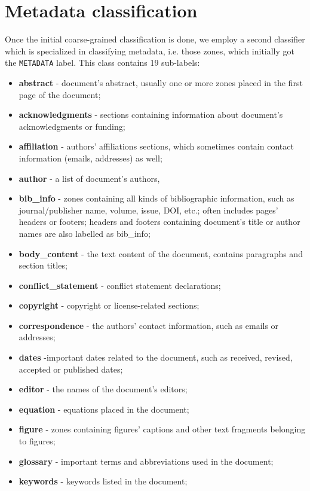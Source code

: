\section{Metadata classification}
Once the initial coarse-grained classification is done, we employ a second classifier which is specialized in classifying metadata, i.e. those zones, which initially got the \verb+METADATA+ label. This class contains 19 sub-labels:
\begin{itemize}
    \item \textbf{abstract} - document's abstract, usually one or more zones placed in the first page of the document;
    \item \textbf{acknowledgments} - sections containing information about document's acknowledgments or funding;
    \item \textbf{affiliation} - authors' affiliations sections, which sometimes contain contact information (emails, addresses) as well;
    \item \textbf{author} - a list of document's authors,
    \item \textbf{bib\_info} - zones containing all kinds of bibliographic information, such as journal/publisher name, volume, issue, DOI, etc.; often includes pages' headers or footers; headers and footers containing document's title or author names are also labelled as bib\_info;
    \item \textbf{body\_content} - the text content of the document, contains paragraphs and section titles;
    \item \textbf{conflict\_statement} - conflict statement declarations;
    \item \textbf{copyright} - copyright or license-related sections;
    \item \textbf{correspondence} - the authors' contact information, such as emails or addresses;
    \item \textbf{dates} -important dates related to the document, such as received, revised, accepted or published dates;
    \item \textbf{editor} - the names of the document's editors;
    \item \textbf{equation} - equations placed in the document;
    \item \textbf{figure} - zones containing figures' captions and other text fragments belonging to figures;
    \item \textbf{glossary} - important terms and abbreviations used in the document;
    \item \textbf{keywords} - keywords listed in the document;

\end{itemize}
